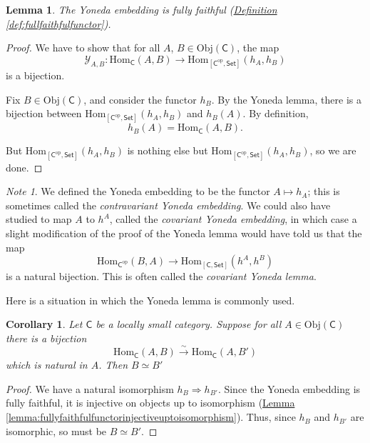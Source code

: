 \documentclass[a4paper,10pt]{scrreprt}
\newcommand{\Obj}{\mathrm{Obj}}
\newcommand{\Hom}{\mathrm{Hom}}
\theoremstyle{definition}
\theoremstyle{plain}
\newtheorem{lemma}{Lemma}[section]
\newtheorem{corollary}{Corollary}[section]
\theoremstyle{remark}
\newtheorem{note}{Note}[section]
\begin{document}
\begin{lemma}
  The Yoneda embedding is fully faithful (\hyperref[def:fullfaithfulfunctor]{Definition \ref*{def:fullfaithfulfunctor}}).
\end{lemma}
\begin{proof}
  We have to show that for all $A$, $B \in \Obj(\mathsf{C})$, the map
  \begin{equation*}
    \mathcal{Y}_{A, B}\colon \Hom_{\mathsf{C}}(A, B) \to \Hom_{[\mathsf{C}^{\mathrm{op}}, \mathsf{Set}]}(h_{A}, h_{B})
  \end{equation*}
  is a bijection.

  Fix $B \in \Obj(\mathsf{C})$, and consider the functor $h_{B}$. By the Yoneda lemma, there is a bijection between $\Hom_{[\mathsf{C}^{\text{op}}, \mathsf{Set}]}(h_{A}, h_{B})$ and $h_{B}(A)$. By definition,
  \begin{equation*}
    h_{B}(A) = \Hom_{\mathsf{C}}(A, B).
  \end{equation*}

  But $\Hom_{[\mathsf{C}^{\text{op}}, \mathsf{Set}]}(h_{A}, h_{B})$ is nothing else but $\Hom_{[\mathsf{C}^{\mathrm{op}}, \mathsf{Set}]}(h_{A}, h_{B})$, so we are done.
\end{proof}

\begin{note}
  \label{note:covariantyonedaembedding}
  We defined the Yoneda embedding to be the functor $A \mapsto h_{A}$; this is sometimes called the \emph{contravariant Yoneda embedding}. We could also have studied to map $A$ to $h^{A}$, called the \emph{covariant Yoneda embedding}, in which case a slight modification of the proof of the Yoneda lemma would have told us that the map
  \begin{equation*}
    \Hom_{\mathsf{C^{\mathrm{op}}}}(B, A) \to \Hom_{[\mathsf{C}, \mathsf{Set}]}(h^{A}, h^{B})
  \end{equation*}
  is a natural bijection. This is often called the \emph{covariant Yoneda lemma}.
\end{note}

Here is a situation in which the Yoneda lemma is commonly used.
\begin{corollary}
  \label{cor:yonedaembeddingrespectsisomorphisms}
  Let $\mathsf{C}$ be a locally small category. Suppose for all $A \in \Obj(\mathsf{C})$ there is a bijection
  \begin{equation*}
    \Hom_{\mathsf{C}}(A, B) \stackrel{\sim}{\to} \Hom_{\mathsf{C}}(A, B')
  \end{equation*}
  which is natural in $A$. Then $B \simeq B'$
\end{corollary}
\begin{proof}
  We have a natural isomorphism $h_{B} \Rightarrow h_{B'}$. Since the Yoneda embedding is fully faithful, it is injective on objects up to isomorphism (\hyperref[lemma:fullyfaithfulfunctorinjectiveuptoisomorphism]{Lemma \ref*{lemma:fullyfaithfulfunctorinjectiveuptoisomorphism}}). Thus, since $h_{B}$ and $h_{B'}$ are isomorphic, so must be $B \simeq B'$.
\end{proof}
\end{document}
